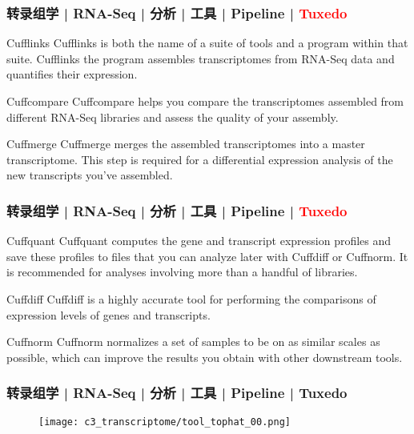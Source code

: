 \begin{frame}
  \frametitle{转录组学 | RNA-Seq | 分析 | 工具 | Pipeline | \textcolor{red}{Tuxedo}}
  \begin{block}{Cufflinks}
    Cufflinks is both the name of a suite of tools and a program within that suite. Cufflinks the program assembles transcriptomes from RNA-Seq data and quantifies their expression.
  \end{block}
  \pause
  \begin{block}{Cuffcompare}
    Cuffcompare helps you compare the transcriptomes assembled from different RNA-Seq libraries and assess the quality of your assembly.
  \end{block}
  \pause
  \begin{block}{Cuffmerge}
    Cuffmerge merges the assembled transcriptomes into a master transcriptome. This step is required for a differential expression analysis of the new transcripts you've assembled. 
  \end{block}
\end{frame}

\begin{frame}
  \frametitle{转录组学 | RNA-Seq | 分析 | 工具 | Pipeline | \textcolor{red}{Tuxedo}}
  \begin{block}{Cuffquant}
    Cuffquant computes the gene and transcript expression profiles and save these profiles to files that you can analyze later with Cuffdiff or Cuffnorm. It is recommended for analyses involving more than a handful of libraries.
  \end{block}
  \pause
  \begin{block}{Cuffdiff}
    Cuffdiff is a highly accurate tool for performing the comparisons of expression levels of genes and transcripts.
  \end{block}
  \pause
  \begin{block}{Cuffnorm}
    Cuffnorm normalizes a set of samples to be on as similar scales as possible, which can improve the results you obtain with other downstream tools.
  \end{block}
\end{frame}

\begin{frame}
  \frametitle{转录组学 | RNA-Seq | 分析 | 工具 | Pipeline | Tuxedo}
  \begin{figure}
    \centering
    \texttt{[image: c3\_transcriptome/tool\_tophat\_00.png]}
  \end{figure}
\end{frame}

